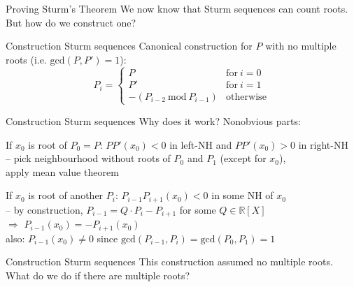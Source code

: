 \documentclass[%
	sans,			%
	mathsans,		%
	10pt,
	t		%
	slidescentered,%
]{beamer}
\newcommand{\RR}{\mathbb{R}}
\begin{document}
\begin{frame}{Proving Sturm's Theorem}
We now know that Sturm sequences can count roots.\\
But how do we construct one?
\end{frame}

\begin{frame}{Construction Sturm sequences}
Canonical construction for $P$ with no multiple roots (i.e. $\mathrm{gcd}(P,P') = 1$):
$$P_i = \begin{cases}
P & \mathrm{for}\ i = 0\\
P' & \mathrm{for}\ i = 1\\
-(P_{i-2}\ \mathrm{mod}\ P_{i-1}) & \mathrm{otherwise}
\end{cases}$$
\end{frame}

\begin{frame}{Construction Sturm sequences}
Why does it work? Nonobvious parts:\\[3mm]\pause

If $x_0$ is root of $P_0 = P$: $PP'(x_0) < 0$ in left-NH and $PP'(x_0) > 0$ in right-NH\\
-- pick neighbourhood without roots of $P_0$ and $P_1$ (except for $x_0$),\\
\hskip3mm apply mean value theorem\\[3mm]\pause

If $x_0$ is root of another $P_i$: $P_{i-1}P_{i+1}(x_0) < 0$ in some NH of $x_0$\\
-- by construction, $P_{i-1} = Q\cdot P_i - P_{i+1}$ for some $Q\in\RR[X]$\\
\hskip3mm$\Longrightarrow$ $P_{i-1}(x_0) = -P_{i+1}(x_0)$\\
\hskip3mm also: $P_{i-1}(x_0)\neq 0$ since $\mathrm{gcd}(P_{i-1}, P_i) = \mathrm{gcd}(P_0,P_1) = 1$
\end{frame}

\begin{frame}{Construction Sturm sequences}
This construction assumed no multiple roots.\\
What do we do if there are multiple roots?
\end{frame}
\end{document}
